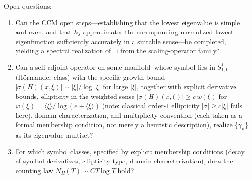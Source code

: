 \documentclass[12pt]{amsart}
\begin{document}
Open questions:
\begin{enumerate}[label=(\arabic*)]
\item Can the CCM open steps---establishing that the lowest eigenvalue
  is simple and even, and that $k_\lambda$ approximates the corresponding
  normalized lowest eigenfunction sufficiently accurately in a suitable
  sense---be completed, yielding a spectral realization of $\Xi$ from
  the scaling-operator family?
\item Can a self-adjoint operator on some manifold, whose symbol lies in
  $S^1_{1,0}$ (H\"ormander class) with the specific growth bound
  $|\sigma(H)(x,\xi)|\sim|\xi|/\log|\xi|$ for large $|\xi|$, together
  with explicit derivative bounds, ellipticity in the weighted sense
  $|\sigma(H)(x,\xi)|\ge c\,w(\xi)$ for $w(\xi)=\langle\xi\rangle/\log(e{+}\langle\xi\rangle)$
  (note: classical order-$1$ ellipticity $|\sigma|\ge c|\xi|$ fails here), domain
  characterization, and multiplicity convention (each taken as a formal
  membership condition, not merely a heuristic description),
  realize $\{\gamma_n\}$ as its eigenvalue multiset?
\item For which symbol classes, specified by explicit membership
  conditions (decay of symbol derivatives, ellipticity type, domain
  characterization), does the counting law $N_H(T)\sim CT\log T$ hold?
\end{enumerate}
\end{document}
